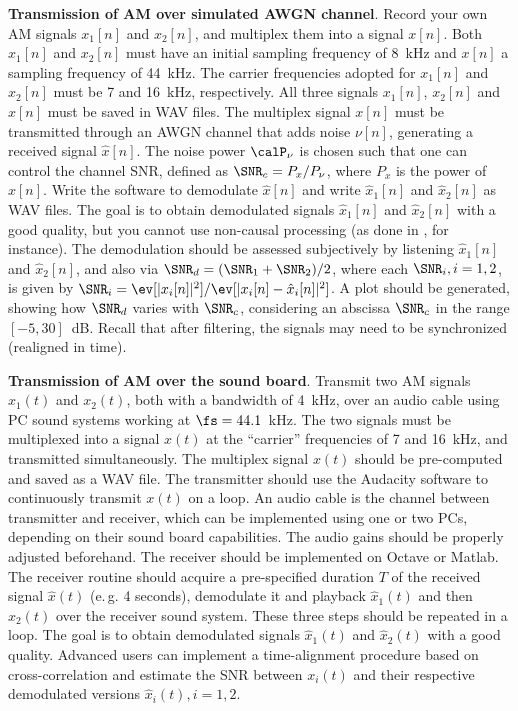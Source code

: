 \bApplication \textbf{Transmission of AM over simulated AWGN channel}.
\label{app:amOverAWGNChanne}
Record your own AM signals $x_1[n]$ and $x_2[n]$, and multiplex them into a signal $x[n]$.
Both $x_1[n]$ and $x_2[n]$ must have an initial sampling frequency of 8~kHz and $x[n]$ a sampling frequency of 44~kHz. The carrier frequencies adopted for $x_1[n]$ and $x_2[n]$ must be 7 and 16~kHz, respectively. All three signals $x_1[n]$, $x_2[n]$ and $x[n]$ must be saved in WAV files. The multiplex signal $x[n]$ must be transmitted through an AWGN channel that adds noise $\nu[n]$, generating a received signal $\hat x[n]$. The noise power $\calP_{\nu}$ is chosen such that one can control the channel SNR, defined as $\SNR_c = P_x / P_{\nu}$, where $P_x$ is the power of $x[n]$. Write the software to demodulate $\hat x[n]$ and write $\hat x_1[n]$ and $\hat x_2[n]$ as WAV files. The goal is to obtain demodulated signals $\hat x_1[n]$ and $\hat x_2[n]$ with a good quality, but you cannot use non-causal processing (as done in , for instance). The demodulation should be assessed subjectively by listening $\hat x_1[n]$ and $\hat x_2[n]$, and also via $\SNR_d = (\SNR_1+\SNR_2)/2$, where each $\SNR_i, i=1,2$, is given by
$\SNR_i = \ev[|x_i[n]|^2] / \ev[|x_i[n] - \hat{x}_i[n]|^2]$. A plot should be generated, showing how $\SNR_d$ varies with $\SNR_c$, considering an abscissa $\SNR_c$ in the range $[-5, 30]$~dB. Recall that after filtering, the signals may need to be synchronized (realigned in time).
\eApplication

\bApplication \textbf{Transmission of AM over the sound board}.
\label{app:amOverSoundBoard}
Transmit two AM signals $x_1(t)$ and $x_2(t)$, both with a bandwidth of 4~kHz, over an audio cable using PC sound systems working at $\fs=44.1$~kHz. The two signals must be multiplexed into a signal $x(t)$ at the ``carrier'' frequencies of 7 and 16~kHz, and transmitted simultaneously. The multiplex signal $x(t)$ should be pre-computed and saved as a WAV file. The transmitter should use the Audacity software to continuously transmit $x(t)$ on a loop. An audio cable is the channel between transmitter and receiver, which can be implemented using one or two PCs, depending on their sound board capabilities. The audio gains should be properly adjusted beforehand. The receiver should be implemented on Octave or Matlab. The receiver routine should acquire a pre-specified duration $T$ of the received signal $\hat x(t)$ (e.\,g. 4 seconds), demodulate it and playback $\hat x_1(t)$ and then $\hat x_2(t)$ over the receiver sound system. These three steps should be repeated in a loop. The goal is to obtain demodulated signals $\hat x_1(t)$ and $\hat x_2(t)$ with a good quality. Advanced users can implement a time-alignment procedure based on cross-correlation and estimate the SNR between $x_i(t)$ and their respective demodulated versions $\hat x_i(t), i=1,2$.
\eApplication



